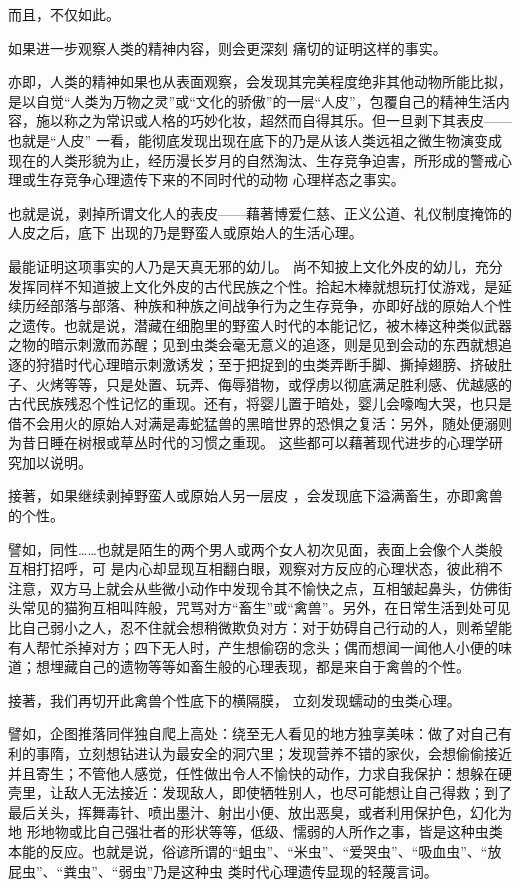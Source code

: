 \documentclass{article}
\begin{document}
\newpage


而且，不仅如此。 

如果进一步观察人类的精神内容，则会更深刻
痛切的证明这样的事实。 

亦即，人类的精神如果也从表面观察，会发现其完美程度绝非其他动物所能比拟，是以自觉“人类为万物之灵”或“文化的骄傲”的一层“人皮”，包覆自己的精神生活内容，施以称之为常识或人格的巧妙化妆，超然而自得其乐。但一旦剥下其表皮——也就是“人皮” 一看，能彻底发现出现在底下的乃是从该人类远祖之微生物演变成现在的人类形貌为止，经历漫长岁月的自然淘汰、生存竞争迫害，所形成的警戒心理或生存竞争心理遗传下来的不同时代的动物
心理样态之事实。 

也就是说，剥掉所谓文化人的表皮——藉著博爱仁慈、正义公道、礼仪制度掩饰的人皮之后，底下
出现的乃是野蛮人或原始人的生活心理。 

最能证明这项事实的人乃是天真无邪的幼儿。
\newpage
尚不知披上文化外皮的幼儿，充分发挥同样不知道披上文化外皮的古代民族之个性。拾起木棒就想玩打仗游戏，是延续历经部落与部落、种族和种族之间战争行为之生存竞争，亦即好战的原始人个性之遗传。也就是说，潜藏在细胞里的野蛮人时代的本能记忆，被木棒这种类似武器之物的暗示刺激而苏醒；见到虫类会毫无意义的追逐，则是见到会动的东西就想追逐的狩猎时代心理暗示刺激诱发；至于把捉到的虫类弄断手脚、撕掉翅膀、挤破肚子、火烤等等，只是处置、玩弄、侮辱猎物，或俘虏以彻底满足胜利感、优越感的古代民族残忍个性记忆的重现。还有，将婴儿置于暗处，婴儿会嚎啕大哭，也只是借不会用火的原始人对满是毒蛇猛兽的黑暗世界的恐惧之复活：另外，随处便溺则为昔日睡在树根或草丛时代的习惯之重现。
这些都可以藉著现代进步的心理学研究加以说明。 

接著，如果继续剥掉野蛮人或原始人另一层皮
，会发现底下溢满畜生，亦即禽兽的个性。 

譬如，同性……也就是陌生的两个男人或两个女人初次见面，表面上会像个人类般互相打招呼，可
\newpage
是内心却显现互相翻白眼，观察对方反应的心理状态，彼此稍不注意，双方马上就会从些微小动作中发现令其不愉快之点，互相皱起鼻头，仿佛街头常见的猫狗互相叫阵般，咒骂对方“畜生”或“禽兽”。另外，在日常生活到处可见比自己弱小之人，忍不住就会想稍微欺负对方：对于妨碍自己行动的人，则希望能有人帮忙杀掉对方；四下无人时，产生想偷窃的念头；偶而想闻一闻他人小便的味道；想埋藏自己的遗物等等如畜生般的心理表现，都是来自于禽兽的个性。

接著，我们再切开此禽兽个性底下的横隔膜，
立刻发现蠕动的虫类心理。 

譬如，企图推落同伴独自爬上高处：绕至无人看见的地方独享美味：做了对自己有利的事隋，立刻想钻进认为最安全的洞穴里；发现营养不错的家伙，会想偷偷接近并且寄生；不管他人感觉，任性做出令人不愉快的动作，力求自我保护：想躲在硬壳里，让敌人无法接近：发现敌人，即使牺牲别人，也尽可能想让自己得救；到了最后关头，挥舞毒针、喷出墨汁、射出小便、放出恶臭，或者利用保护色，幻化为地
\newpage
形地物或比自己强壮者的形状等等，低级、懦弱的人所作之事，皆是这种虫类本能的反应。也就是说，俗谚所谓的“蛆虫”、“米虫”、“爱哭虫”、“吸血虫”、“放屁虫”、“粪虫”、“弱虫”乃是这种虫
类时代心理遗传显现的轻蔑言词。 
\end{document}
